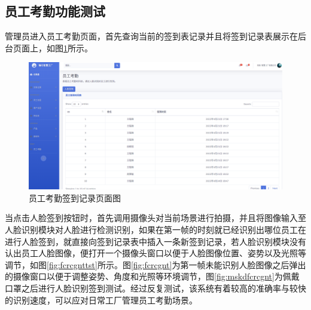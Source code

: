 \subsection{员工考勤功能测试}

管理员进入员工考勤页面，首先查询当前的签到表记录并且将签到记录表展示在后台页面上，如图\ref{fig:empleatdc}所示。

\begin{figure}[H]
    \centering
    \includegraphics[width=.75\textwidth]{figures/6employeeattendance.png}
    \caption{员工考勤签到记录页面图}
    \label{fig:empleatdc}
\end{figure}

当点击人脸签到按钮时，首先调用摄像头对当前场景进行拍摄，并且将图像输入至人脸识别模块对人脸进行检测识别，如果在第一帧的时刻就已经识别出哪位员工在进行人脸签到，就直接向签到记录表中插入一条新签到记录，若人脸识别模块没有认出员工人脸图像，便打开一个摄像头窗口以便于人脸图像位置、姿势以及光照等调节，如图\ref{fig:fcrcgnttst}所示。图\ref{fig:fcrcgnt}为第一帧未能识别人脸图像之后弹出的摄像窗口以便于调整姿势、角度和光照等环境调节，图\ref{fig:mskdfcrcgnt}为佩戴口罩之后进行人脸识别签到测试。经过反复测试，该系统有着较高的准确率与较快的识别速度，可以应对日常工厂管理员工考勤场景。


